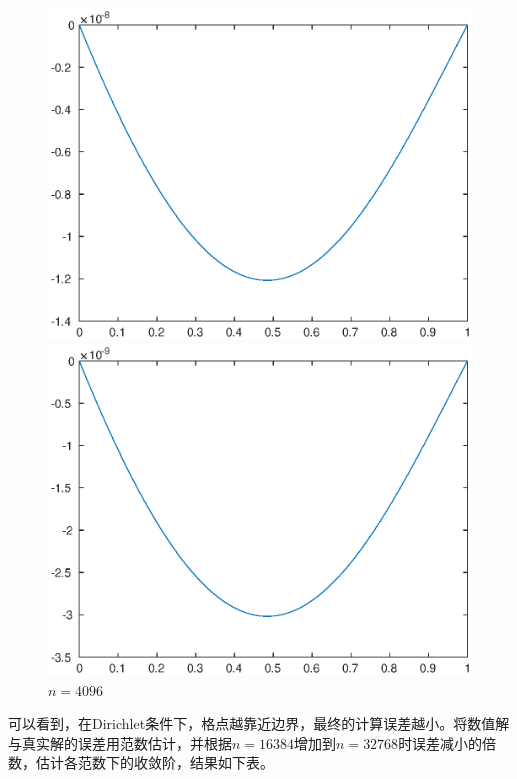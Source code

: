 \documentclass[lang=cn,10pt]{elegantbook}
\begin{document}
\begin{figure}[H]
\begin{minipage}[t]{0.24\linewidth}
    \includegraphics[width=0.95\linewidth]{figure/1-1-3.eps}
    \caption*{$n=2048$}
  \end{minipage}
  \begin{minipage}[t]{0.24\linewidth}
    \centering
    \includegraphics[width=0.95\linewidth]{figure/1-1-4.eps}
    \caption*{$n=4096$}
  \end{minipage}
\end{figure}

可以看到，在Dirichlet条件下，格点越靠近边界，最终的计算误差越小。将数值解与真实解的误差用范数估计，并根据$n=16384$增加到$n=32768$时误差减小的倍数，估计各范数下的收敛阶，结果如下表。
\end{document}
